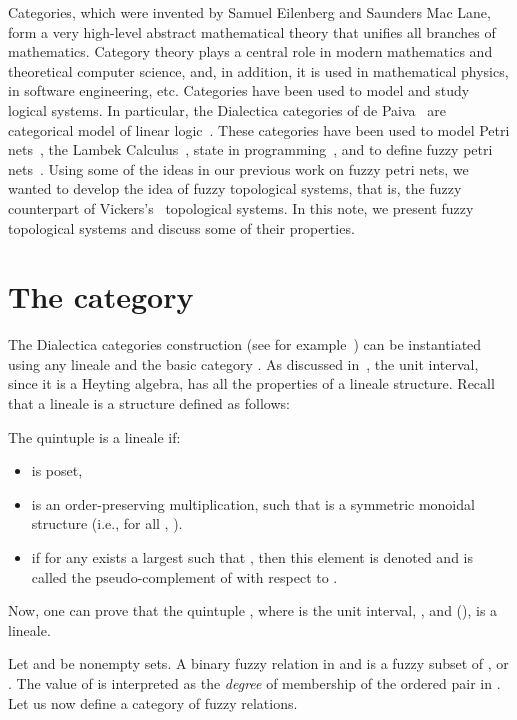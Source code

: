 \documentclass[11pt]{article}
\newenvironment{definition}[1][Definition]{\begin{trivlist}
\item[\hskip \labelsep {\bfseries #1}]}{\end{trivlist}}
\begin{document}
Categories, which were invented by Samuel Eilenberg and Saunders Mac Lane, form a very 
high-level abstract mathematical theory that unifies all branches of mathematics.
Category theory plays a central role in modern mathematics and 
theoretical computer science, and, in addition,  it is used in mathematical 
physics, in  software engineering, etc. Categories have been used to model and
study logical systems. In particular, the Dialectica categories of de Paiva~\cite{paiva89} 
are categorical model of linear logic~\cite{girard95}. These categories have been used
to model Petri nets~\cite{brown90}, the Lambek Calculus~\cite{paiva90}, 
state in programming~\cite{correaetal96}, and to define fuzzy petri 
nets~\cite{paivasyropoulos11}. Using some of the ideas in our previous work on 
fuzzy petri nets, we wanted to develop the idea of fuzzy topological systems, that is, 
the fuzzy counterpart of Vickers's~\cite{vickers90} topological systems. In this note, 
we present fuzzy topological systems and discuss some of their properties. 

\section{The category }\label{basic:notions}
The Dialectica categories construction (see for example~\cite{paiva06}) can be  
instantiated using any lineale  and the basic category .  As discussed 
in~\cite{syropoulos06}, the unit interval, since it is a Heyting algebra, has all the 
properties of a lineale structure. Recall that a lineale is a structure defined as follows:
\begin{definition}
The quintuple  is a lineale if:
\begin{itemize}
\item  is poset,
\item  is an order-preserving multiplication,
      such that  is a symmetric monoidal structure (i.e.,
      for all , ).
\item if for any  exists a largest  such that 
      , then this element is denoted  and
      is called the pseudo-complement of  with respect to .
\end{itemize}
\end{definition}
Now, one can prove that the quintuple 
, where  is the unit interval, 
, and   
(),  is a lineale.

Let  and  be nonempty sets. A binary fuzzy relation  in  and  is a 
fuzzy subset of , or . The value of  
is interpreted as the {\em degree} of membership of the ordered pair  in . 
Let us now define a category of fuzzy relations.
 
\end{document}
